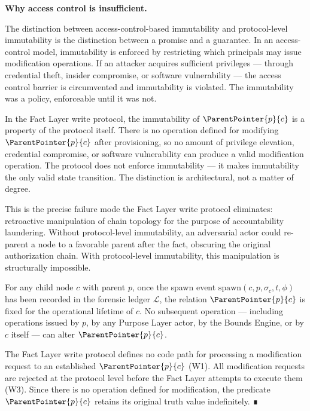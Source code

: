 \medskip
\noindent\textbf{Why access control is insufficient.}

The distinction between access-control-based immutability and protocol-level immutability is the distinction between a promise and a guarantee. In an access-control model, immutability is enforced by restricting which principals may issue modification operations. If an attacker acquires sufficient privileges --- through credential theft, insider compromise, or software vulnerability --- the access control barrier is circumvented and immutability is violated. The immutability was a policy, enforceable until it was not.

In the Fact Layer write protocol, the immutability of $\ParentPointer{p}{c}$ is a property of the protocol itself. There is no operation defined for modifying $\ParentPointer{p}{c}$ after provisioning, so no amount of privilege elevation, credential compromise, or software vulnerability can produce a valid modification operation. The protocol does not enforce immutability --- it makes immutability the only valid state transition. The distinction is architectural, not a matter of degree.

This is the precise failure mode the Fact Layer write protocol eliminates: retroactive manipulation of chain topology for the purpose of accountability laundering. Without protocol-level immutability, an adversarial actor could re-parent a node to a favorable parent after the fact, obscuring the original authorization chain. With protocol-level immutability, this manipulation is structurally impossible.

\begin{prop}
\label{prop:parent-pointer-immutable}
For any child node $c$ with parent $p$, once the spawn event $\mathrm{spawn}(c, p, \sigma_c, t, \phi)$ has been recorded in the forensic ledger $\mathcal{L}$, the relation $\ParentPointer{p}{c}$ is fixed for the operational lifetime of $c$. No subsequent operation --- including operations issued by $p$, by any Purpose Layer actor, by the Bounds Engine, or by $c$ itself --- can alter $\ParentPointer{p}{c}$.
\end{prop}
\begin{pf}
The Fact Layer write protocol defines no code path for processing a modification request to an established $\ParentPointer{p}{c}$ (W1). All modification requests are rejected at the protocol level before the Fact Layer attempts to execute them (W3). Since there is no operation defined for modification, the predicate $\ParentPointer{p}{c}$ retains its original truth value indefinitely. ∎
\end{pf}

